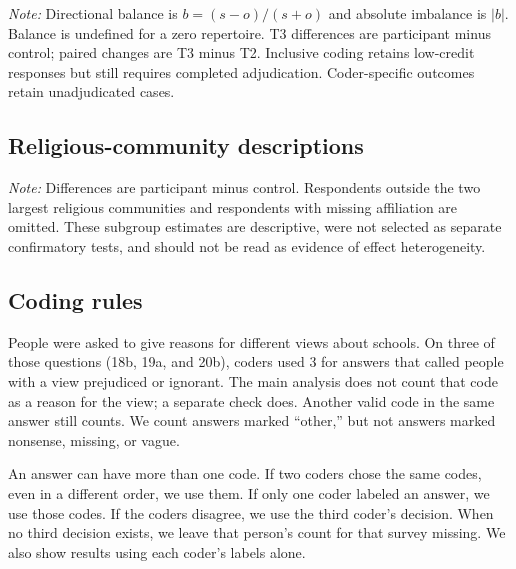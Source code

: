 \documentclass[11pt]{article}
\begin{document}
\begin{table}[H]
\centering
\small
\caption{Sensitivity of directional balance to coding choices}
\resizebox{\textwidth}{!}{%

}
\begin{minipage}{0.95\textwidth}
\smallskip\footnotesize
\textit{Note:} Directional balance is $b=(s-o)/(s+o)$ and absolute imbalance is $|b|$.
Balance is undefined for a zero repertoire. T3 differences are participant minus control;
paired changes are T3 minus T2. Inclusive coding retains low-credit responses but still
requires completed adjudication. Coder-specific outcomes retain unadjudicated cases.
\end{minipage}
\end{table}

\clearpage
\subsection{Religious-community descriptions}

\begin{table}[H]
\centering
\caption{T3 total repertoires by religious community}
\resizebox{0.98\textwidth}{!}{%

}
\begin{minipage}{0.95\textwidth}
\smallskip\footnotesize
\textit{Note:} Differences are participant minus control. Respondents outside the two largest
religious communities and respondents with missing affiliation are omitted. These subgroup
estimates are descriptive, were not selected as separate confirmatory tests, and should not be
read as evidence of effect heterogeneity.
\end{minipage}
\end{table}

\subsection{Coding rules}

People were asked to give reasons for different views about schools. On three of those
questions (18b, 19a, and 20b), coders used 3 for answers that called people with a view
prejudiced or ignorant. The main analysis does not count that code as a reason for the view;
a separate check does. Another valid code in the same answer still counts. We count answers
marked ``other,'' but not answers marked nonsense, missing, or vague.

An answer can have more than one code. If two coders chose the same codes, even in a different
order, we use them. If only one coder labeled an answer, we use those codes. If the coders
disagree, we use the third coder's decision. When no third decision exists, we leave that
person's count for that survey missing. We also show results using each coder's labels alone.
\end{document}
